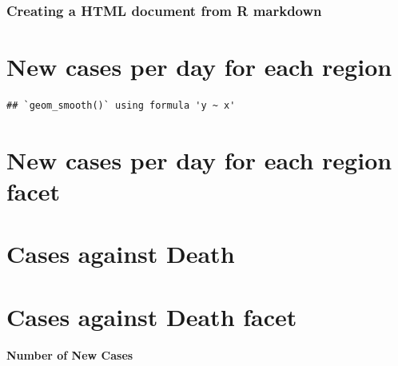 \documentclass[
]{article}
\begin{document}
\hypertarget{creating-a-html-document-from-r-markdown}{%
\subsubsection{Creating a HTML document from R
markdown}\label{creating-a-html-document-from-r-markdown}}

\hypertarget{new-cases-per-day-for-each-region}{%
\section{New cases per day for each
region}\label{new-cases-per-day-for-each-region}}

\begin{verbatim}
## `geom_smooth()` using formula 'y ~ x'
\end{verbatim}

\hypertarget{new-cases-per-day-for-each-region-facet}{%
\section{New cases per day for each region
facet}\label{new-cases-per-day-for-each-region-facet}}

\hypertarget{cases-against-death}{%
\section{Cases against Death}\label{cases-against-death}}

\hypertarget{cases-against-death-facet}{%
\section{Cases against Death facet}\label{cases-against-death-facet}}

\hypertarget{number-of-new-cases}{%
\paragraph{Number of New Cases}\label{number-of-new-cases}}
\end{document}
